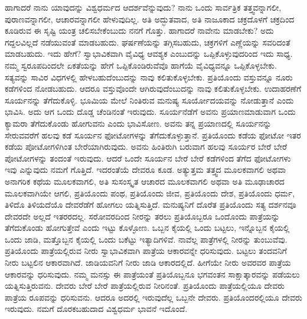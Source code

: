 ಹಾಗಾದರೆ ನಾನು ಯಾವುದನ್ನು ವಿಶ್ವಧರ್ಮದ ಆದರ್ಶವೆನ್ನುವುದು? ನಾನು ಒಂದು ಸಾರ್ವತ್ರಿಕ ತತ್ತ್ವವನ್ನಾಗಲೀ, ಪುರಾಣವನ್ನಾಗಲೀ, ಆಚಾರವನ್ನಾಗಲೀ ಹೇಳುವುದಿಲ್ಲ. ಅತಿ ಅದ್ಭುತವಾದ, ಅತಿ ನಾಜೂಕಾದ ಚಕ್ರದೊಳಗೆ ಚಕ್ರದಿಂದ ಕೂಡಿರುವ ಈ ಸೃಷ್ಟಿ ಯಂತ್ರ ಚಲಿಸಬೇಕೆಂಬುದು ನನಗೆ ಗೊತ್ತು. ಹಾಗಾದರೆ ನಾವೇನು ಮಾಡಬೇಕು? ಅದು ಗದ್ದಲವಿಲ್ಲದೆ ನಡೆಯುವಂತೆ ಮಾಡಬಹುದು. ಘರ್ಷಣೆಯನ್ನು ತಗ್ಗಿಸಬಹುದು, ಚಕ್ರಗಳಿಗೆ ಎಣ್ಣೆಯನ್ನು ಸವರಿದಂತೆ ಮಾಡಬಹುದು. ಇದು ಹೇಗೆ? ಸ್ವಾಭಾವಿಕವಾಗಿ ವೈವಿಧ್ಯ ಆವಶ್ಯಕ ಎಂಬುದನ್ನು ಒಪ್ಪಿಕೊಳ್ಳುವುದರಿಂದ ಇದು ಸಾಧ್ಯ. ನಮ್ಮ ಸ್ವರೂಪದಿಂದಲೇ ಏಕತೆಯನ್ನು ಹೇಗೆ ಒಪ್ಪಿಕೊಂಡಿರುವೆವೊ ಹಾಗೆಯೆ ವೈವಿಧ್ಯವನ್ನೂ ಒಪ್ಪಿಕೊಳ್ಳಬೇಕು. ಸತ್ಯವನ್ನು ಸಾವಿರ ವಿಧಗಳಲ್ಲಿ ಹೇಳಬಹುದೆಂಬುದನ್ನು ನಾವು ಕಲಿತುಕೊಳ್ಳಬೇಕು. ಪ್ರತಿಯೊಂದು ವಸ್ತುವನ್ನೂ ನೂರು ಕಡೆಗಳಿಂದ ನೋಡಬಹುದು. ಆದರೂ ವಸ್ತುವೊಂದೇ ಆಗಿರುವುದೆಂಬುದನ್ನು ನಾವು ಕಲಿತುಕೊಳ್ಳಬೇಕು. ಉದಾಹರಣೆಗೆ ಸೂರ್ಯನನ್ನು ತೆಗೆದುಕೊಳ್ಳಿ. ಭೂಮಿಯ ಮೇಲೆ ನಿಂತಿರುವ ಮನುಷ್ಯ ಸೂರ್ಯೋದಯವನ್ನು ನೋಡುತ್ತಾನೆ ಎಂದು ಭಾವಿಸಿ. ಅದು ಆಗ ಒಂದು ದೊಡ್ಡ ಚೆಂಡಿನಂತೆ ಇರುವುದು. ಸೂರ್ಯನೆಡೆಗೆ ಅವನು ಪ್ರಯಾಣಮಾಡುವಾಗ ಒಂದು ಕ್ಯಾಮರಾ ತೆಗೆದುಕೊಂಡು ಹೋಗುವನು ಎಂದು ಭಾವಿಸೋಣ. ಅವನು ತನ್ನ ಪ್ರಯಾಣದಲ್ಲಿ ಸೂರ್ಯನನ್ನು ಸೇರುವವರೆಗೆ ಹಲವು ಕಡೆ ಸೂರ್ಯನ ಫೋಟೋಗಳನ್ನು ತೆಗೆದುಕೊಳ್ಳುತ್ತಾನೆ. ಪ್ರತಿಯೊಂದು ಕಡೆಯ ಫೋಟೋ ಇತರ ಕಡೆಯ ಪೋಟೋಗಳಿಗಿಂತ ಬೇರೆಯಾಗಿರುವುದು. ಅವನು ಹಿಂತಿರುಗಿ ಬರುವಾಗ ಹಲವು ಸೂರ್ಯರ ಬೇರೆ ಬೇರೆ ಪೋಟೋಗಳನ್ನು ತಂದಂತೆ ಇರುವುದು. ಆದರೆ ಒಂದೇ ಸೂರ್ಯನ ಬೇರೆ ಬೇರೆ ಕಡೆಗಳಿಂದ ತೆಗೆದ ಫೋಟೋಗಳು ಇವು ಎನ್ನುವುದು ನಮಗೆ ಗೊತ್ತಿದೆ. ಇದರಂತೆಯೆ ದೇವರೂ ಕೂಡ. ಅತ್ಯುತ್ತಮ ತತ್ತ್ವದ ಮೂಲಕವಾಗಲಿ ಅಥವಾ ಅನಾಗರಿಕ ಕಥೆಯ ಮೂಲಕವಾಗಲಿ, ಅತಿ ಸುಸಂಸ್ಕೃತ ಆಚಾರದ ಮೂಲಕವಾಗಲಿ ಅಥವಾ ಅತಿ ಮೂಢಾಚಾರದ ಮೂಲಕವಾಗಿಯೇ ಆಗಲಿ, ಪ್ರತಿಯೊಂದು ಪಂಥ, ಪ್ರತಿಯೊಂದು ಜೀವ, ಪ್ರತಿಯೊಂದು ದೇಶ, ಪ್ರತಿಯೊಂದು ಧರ್ಮ, ತಿಳಿದೊ ತಿಳಿಯದೆಯೊ ದೇವರೆಡೆಗೆ ಹೋಗಲು ಯತ್ನಿಸುತ್ತಿದೆ. ಮನುಷ್ಯನಿಗೆ ದೊರೆತ ಪ್ರತಿಯೊಂದು ಸತ್ಯ ದರ್ಶನವೂ ದೇವರದೇ ಅಲ್ಲದೆ ಇತರರದಲ್ಲ. ಸರೋವರದಿಂದ ನೀರನ್ನು ತರಲು ಪ್ರತಿಯೊಬ್ಬರೂ ಒಂದೊಂದು ಪಾತ್ರೆಯನ್ನು ತೆಗೆದುಕೊಂಡು ಹೋಗುತ್ತೇವೆ ಎಂದು ಇಟ್ಟು ಕೊಳ್ಳೋಣ. ಒಬ್ಬನ ಕೈಯಲ್ಲಿ ಒಂದು ಬಟ್ಟಲು, ಇನ್ನೊಬ್ಬನ ಕೈಯಲ್ಲಿ ಒಂದು ಜಾಡಿ, ಮತ್ತೊಬ್ಬನ ಕೈಯಲ್ಲಿ ಒಂದು ಬಕೆಟ್ಟು ಇತ್ಯಾದಿಗಳಿವೆ. ನಾವೆಲ್ಲ ಪಾತ್ರೆಗಳಲ್ಲಿ ನೀರನ್ನು ತುಂಬುವೆವು. ಪ್ರತಿಯೊಂದು ಪಾತ್ರೆಯಲ್ಲಿರುವ ನೀರು ಸ್ವಾಭಾವಿಕವಾಗಿ ಪಾತ್ರೆಯ ಆಕಾರವನ್ನೇ ಧರಿಸುವುದು. ಬಟ್ಟಲು ತಂದವನಿಗೆ ನೀರು ಬಟ್ಟಲಿನ ಆಕಾರವಾಗಿದೆ. ಜಾಡಿಯವನಿಗೆ ನೀರು ಜಾಡಿ ಆಕಾರದಲ್ಲಿದೆ. ಹೀಗೆಯೇ ನೀರು ಅವರವರ ಪಾತ್ರೆಯ ಆಕಾರವನ್ನು ಧರಿಸುವುದು. ನಮ್ಮ ಮನಸ್ಸು ಈ ಪಾತ್ರೆಯಂತೆ ಪ್ರತಿಯೊಬ್ಬನೂ ಭಗವಂತನ ಸಾಕ್ಷಾತ್ಕಾರವನ್ನು ಪಡೆಯಲು ಯತ್ನಿಸುತ್ತಿರುವನು. ದೇವರು ಬೇರೆ ಬೇರೆ ಪಾತ್ರೆಯಲ್ಲಿರುವ ನೀರಿನಂತೆ. ಪ್ರತಿಯೊಂದು ಪಾತ್ರೆಯಲ್ಲಿಯೂ ದೇವರು ಪಾತ್ರೆಯ ರೂಪವನ್ನು ಧರಿಸುವನು. ಆದರೂ ಅದರಲ್ಲಿ ಇರುವುದೆಲ್ಲ ಒಬ್ಬನೇ ದೇವರು. ಪ್ರತಿಯೊಂದರಲ್ಲಿಯೂ ದೇವರು ಇರುವುದು. ನಮಗೆ ದೊರಕಬಹುದಾದ ವಿಶ್ವಧರ್ಮ ಭಾವನೆ ಇದೊಂದೆ.

\vskip 5pt


